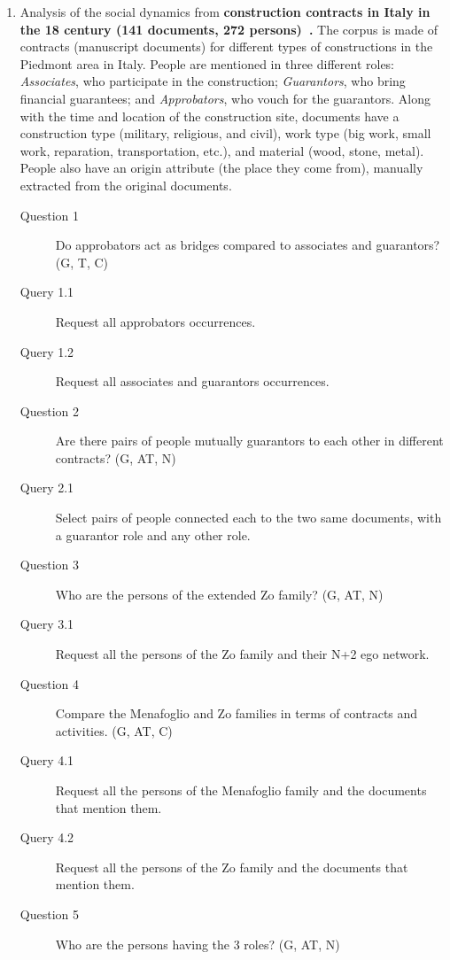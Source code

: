 \begin{enumerate}
    \item Analysis of the social dynamics from \textbf{construction contracts in Italy in the 18 century (141 documents, 272 persons)~\cite{Cristofoli2018}.}
    The corpus is made of contracts (manuscript documents) for different types of constructions in the Piedmont area in Italy. People are mentioned in three different roles: \textit{Associates}, who participate in the construction; \textit{Guarantors}, who bring financial guarantees; and \textit{Approbators}, who vouch for the guarantors. Along with the time and location of the construction site, documents have a construction type (military, religious, and civil), work type (big work, small work, reparation, transportation, etc.), and material (wood, stone, metal). People also have an origin attribute (the place they come from), manually extracted from the original documents.
    \begin{footnotesize}
    \begin{description}
    \item[Question 1] Do approbators act as bridges compared to associates and guarantors? (G, T, C)
    \item[\myindent Query 1.1] Request all approbators occurrences.
    \item[\myindent Query 1.2 ] Request all associates and guarantors occurrences.
    \item[Question 2] Are there pairs of people mutually guarantors to each other in different contracts? (G, AT, N)
    \item[\myindent Query 2.1] Select pairs of people connected each to the two same documents, with a guarantor role and any other role.
    \item[Question 3] Who are the persons of the extended Zo family? (G, AT, N)
    \item[\myindent Query 3.1] Request all the persons of the Zo family and their N+2 ego network.
    \item[Question 4] Compare the Menafoglio and Zo families in terms of contracts and activities. (G, AT, C)
    \item[\myindent Query 4.1] Request all the persons of the Menafoglio family and the documents that mention them.
    \item[\myindent Query 4.2] Request all the persons of the Zo family and  the documents that mention them.
    \item[Question 5] Who are the persons having the 3 roles? (G, AT, N)

\end{description}
\end{footnotesize}
\end{enumerate}
